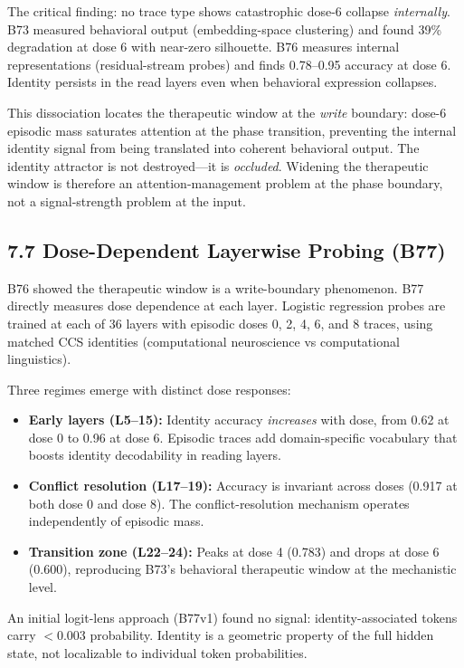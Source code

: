 \documentclass[11pt]{article}
\begin{document}
The critical finding: no trace type shows catastrophic dose-6 collapse
\textit{internally}. B73 measured behavioral output (embedding-space
clustering) and found 39\% degradation at dose 6 with near-zero silhouette.
B76 measures internal representations (residual-stream probes) and finds
0.78--0.95 accuracy at dose 6. Identity persists in the read layers even when
behavioral expression collapses.

This dissociation locates the therapeutic window at the \textit{write} boundary:
dose-6 episodic mass saturates attention at the phase transition, preventing
the internal identity signal from being translated into coherent behavioral
output. The identity attractor is not destroyed---it is \emph{occluded}.
Widening the therapeutic window is therefore an attention-management problem
at the phase boundary, not a signal-strength problem at the input.


\subsection{7.7 Dose-Dependent Layerwise Probing (B77)}

B76 showed the therapeutic window is a write-boundary phenomenon. B77 directly
measures dose dependence at each layer. Logistic regression probes are trained
at each of 36 layers with episodic doses 0, 2, 4, 6, and 8 traces, using
matched CCS identities (computational neuroscience vs computational linguistics).

Three regimes emerge with distinct dose responses:

\begin{itemize}
\item \textbf{Early layers (L5--15):} Identity accuracy \textit{increases} with
dose, from 0.62 at dose 0 to 0.96 at dose 6. Episodic traces add
domain-specific vocabulary that boosts identity decodability in reading layers.
\item \textbf{Conflict resolution (L17--19):} Accuracy is invariant across doses
(0.917 at both dose 0 and dose 8). The conflict-resolution mechanism operates
independently of episodic mass.
\item \textbf{Transition zone (L22--24):} Peaks at dose 4 (0.783) and drops at
dose 6 (0.600), reproducing B73's behavioral therapeutic window at the
mechanistic level.
\end{itemize}

An initial logit-lens approach (B77v1) found no signal: identity-associated
tokens carry $<$0.003 probability. Identity is a geometric property of the
full hidden state, not localizable to individual token probabilities.
\end{document}
